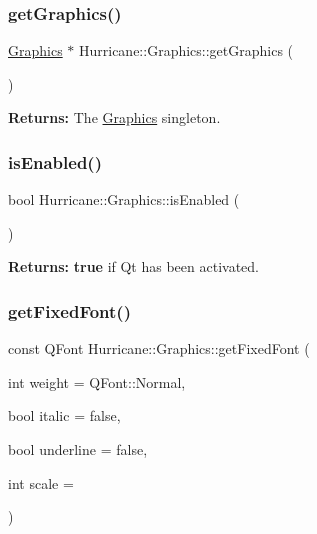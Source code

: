 \subsubsection{\texorpdfstring{get\+Graphics()}{getGraphics()}}
{\footnotesize\ttfamily \hyperlink{classHurricane_1_1Graphics}{Graphics} $\ast$ Hurricane\+::\+Graphics\+::get\+Graphics (\begin{DoxyParamCaption}{ }\end{DoxyParamCaption})\hspace{0.3cm}{\ttfamily [static]}}

{\bfseries Returns\+:} The \hyperlink{classHurricane_1_1Graphics}{Graphics} singleton. \mbox{\label{classHurricane_1_1Graphics_a02964067103bdd4c27bbf4af91a47cf8}} 
\subsubsection{\texorpdfstring{is\+Enabled()}{isEnabled()}}
{\footnotesize\ttfamily bool Hurricane\+::\+Graphics\+::is\+Enabled (\begin{DoxyParamCaption}{ }\end{DoxyParamCaption})\hspace{0.3cm}{\ttfamily [static]}}

{\bfseries Returns\+:} {\bfseries true} if Qt has been activated. \mbox{\label{classHurricane_1_1Graphics_a30322de9fd4a042d8773465c622a1650}} 
\subsubsection{\texorpdfstring{get\+Fixed\+Font()}{getFixedFont()}}
{\footnotesize\ttfamily const Q\+Font Hurricane\+::\+Graphics\+::get\+Fixed\+Font (\begin{DoxyParamCaption}\item[{int}]{weight = {\ttfamily QFont\+:\+:Normal},  }\item[{bool}]{italic = {\ttfamily false},  }\item[{bool}]{underline = {\ttfamily false},  }\item[{int}]{scale = {} }\end{DoxyParamCaption})\hspace{0.3cm}{\ttfamily [static]}}


